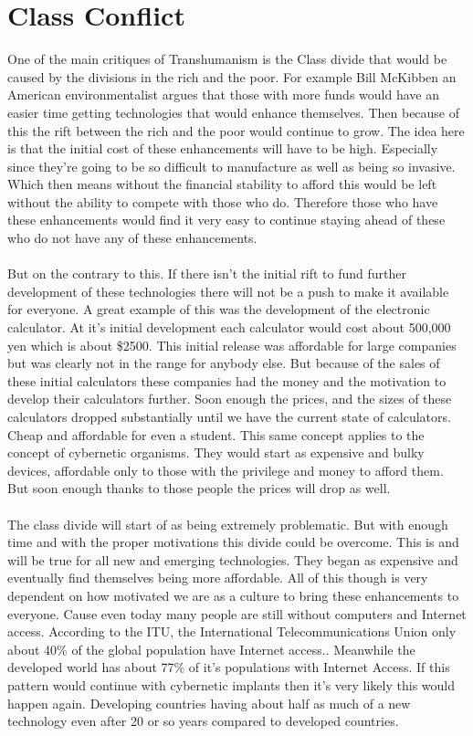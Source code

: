 \documentclass[12pt,a4paper,notitlepage]{article}
\begin{document}
\section{Class Conflict}
One of the main critiques of Transhumanism is the Class divide that would be
caused by the divisions in the rich and the poor. For example Bill McKibben an
American environmentalist argues that those with more funds would have an easier
time getting technologies that would enhance themselves. Then because of this
the rift between the rich and the poor would continue to grow. The idea here is
that the initial cost of these enhancements will have to be high. Especially
since they're going to be so difficult to manufacture as well as being so
invasive. Which then means without the financial stability to afford this would
be left without the ability to compete with those who do. Therefore those who
have these enhancements would find it very easy to continue staying ahead of
these who do not have any of these enhancements.
\\\\
But on the contrary to this. If there isn't the initial rift to fund further
development of these technologies there will not be a push to make it available
for everyone. A great example of this was the development of the electronic
calculator. At it's initial development each calculator would cost about 500,000
yen which is about \$2500. This initial release was affordable for large
companies but was clearly not in the range for anybody else. But because of the
sales of these initial calculators these companies had the money and the
motivation to develop their calculators further. Soon enough the prices, and the
sizes of these calculators dropped substantially until we have the current state
of calculators. Cheap and affordable for even a student. This same concept
applies to the concept of cybernetic organisms. They would start as expensive
and bulky devices, affordable only to those with the privilege and money to
afford them. But soon enough thanks to those people the prices will drop as
well.
\\\\
The class divide will start of as being extremely problematic. But with enough
time and with the proper motivations this divide could be overcome. This is and
will be true for all new and emerging technologies. They began as expensive and
eventually find themselves being more affordable. All of this though is very
dependent on how motivated we are as a culture to bring these enhancements to
everyone. Cause even today many people are still without computers and Internet
access. According to the ITU, the International Telecommunications Union only
about 40\% of the global population have Internet access.\cite{itu}. Meanwhile
the developed world has about 77\% of it's populations with Internet Access. If
this pattern would continue with cybernetic implants then it's very likely this
would happen again. Developing countries having about half as much of a new
technology even after 20 or so years compared to developed countries.
\\
\end{document}
